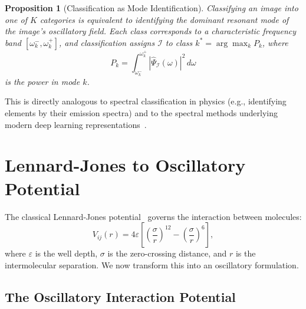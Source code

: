 \documentclass[11pt,twocolumn,a4paper]{article}
\newtheorem{proposition}[theorem]{Proposition}
\begin{document}
\begin{proposition}[Classification as Mode Identification]\label{prop:classification}
Classifying an image into one of $K$ categories is equivalent to identifying the dominant resonant mode of the image's oscillatory field. Each class corresponds to a characteristic frequency band $[\omega_k^{-}, \omega_k^{+}]$, and classification assigns $\mathcal{I}$ to class $k^* = \arg\max_k P_k$, where
\begin{equation}
    P_k = \int_{\omega_k^{-}}^{\omega_k^{+}} |\hat{\Psi}_{\mathcal{I}}(\omega)|^2 \, d\omega
    \label{eq:mode_power}
\end{equation}
is the power in mode $k$.
\end{proposition}

This is directly analogous to spectral classification in physics (e.g., identifying elements by their emission spectra) and to the spectral methods underlying modern deep learning representations~\citep{oquab2024}.

\section{Lennard-Jones to Oscillatory Potential}\label{sec:lennardjones}


The classical Lennard-Jones potential~\citep{lennardjones1924} governs the interaction between molecules:
\begin{equation}
    V_{ij}(r) = 4\varepsilon \left[ \left(\frac{\sigma}{r}\right)^{12} - \left(\frac{\sigma}{r}\right)^{6} \right],
    \label{eq:lj_classical}
\end{equation}
where $\varepsilon$ is the well depth, $\sigma$ is the zero-crossing distance, and $r$ is the intermolecular separation. We now transform this into an oscillatory formulation.

\subsection{The Oscillatory Interaction Potential}
\end{document}
